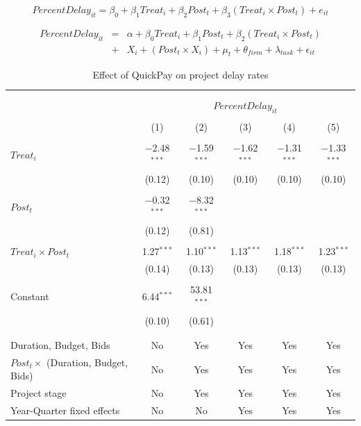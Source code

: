 \documentclass[
]{article}
\begin{document}
\[ PercentDelay_{it} = \beta_0 + \beta_1 Treat_i + \beta_2 Post_t + \beta_3 (Treat_i \times Post_t) + e_{it}\]

\[ \begin{aligned} PercentDelay_{it} &=& \alpha+\beta_0 Treat_i + \beta_1 Post_t + \beta_2 (Treat_i \times Post_t)\\
&+&  X_i + (Post_t \times X_i) + \mu_t + \theta_{firm} + \lambda_{task}+ \epsilon_{it}
\end{aligned}\]

\begin{table}[H] \centering 
  \caption{Effect of QuickPay on project delay rates} 
  \label{} 
\small 
\begin{tabular}{@{\extracolsep{-2pt}}lccccc} 
\\[-1.8ex]\hline 
\hline \\[-1.8ex] 
\\[-1.8ex] & \multicolumn{5}{c}{$PercentDelay_{it}$} \\ 
\\[-1.8ex] & (1) & (2) & (3) & (4) & (5)\\ 
\hline \\[-1.8ex] 
 $Treat_i$ & $-$2.48$^{***}$ & $-$1.59$^{***}$ & $-$1.62$^{***}$ & $-$1.31$^{***}$ & $-$1.33$^{***}$ \\ 
  & (0.12) & (0.10) & (0.10) & (0.10) & (0.10) \\ 
  & & & & & \\ 
 $Post_t$ & $-$0.32$^{***}$ & $-$8.32$^{***}$ &  &  &  \\ 
  & (0.12) & (0.81) &  &  &  \\ 
  & & & & & \\ 
 $Treat_i \times Post_t$ & 1.27$^{***}$ & 1.10$^{***}$ & 1.13$^{***}$ & 1.18$^{***}$ & 1.23$^{***}$ \\ 
  & (0.14) & (0.13) & (0.13) & (0.13) & (0.13) \\ 
  & & & & & \\ 
 Constant & 6.44$^{***}$ & 53.81$^{***}$ &  &  &  \\ 
  & (0.10) & (0.61) &  &  &  \\ 
  & & & & & \\ 
\hline \\[-1.8ex] 
Duration, Budget, Bids & No & Yes & Yes & Yes & Yes \\ 
$Post_t \times$  (Duration, Budget, Bids) & No & Yes & Yes & Yes & Yes \\ 
Project stage & No & Yes & Yes & Yes & Yes \\ 
Year-Quarter fixed effects & No & No & Yes & Yes & Yes \\ 

\end{tabular}
\end{table}
\end{document}
